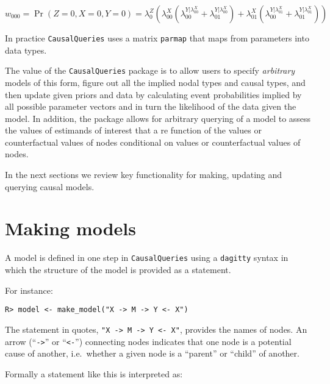 \documentclass[
  11pt,
  article]{jss}
\begin{document}
\[w_{000}=\Pr(Z=0, X=0, Y=0) = \lambda^Z_0\left(\lambda^X_{00}(\lambda^{Y|\lambda^X_{00}}_{00}+\lambda^{Y|\lambda^X_{00}}_{01}) + \lambda^X_{01}(\lambda^{Y|\lambda^X_{01}}_{00}+\lambda^{Y|\lambda^X_{01}}_{01})\right)\]

In practice \texttt{CausalQueries} uses a matrix \texttt{parmap} that
maps from parameters into data types.

The value of the \texttt{CausalQueries} package is to allow users to
specify \emph{arbitrary} models of this form, figure out all the implied
nodal types and causal types, and then update given priors and data by
calculating event probabilities implied by all possible parameter
vectors and in turn the likelihood of the data given the model. In
addition, the package allows for arbitrary querying of a model to assess
the values of estimands of interest that a re function of the values or
counterfactual values of nodes conditional on values or counterfactual
values of nodes.

In the next sections we review key functionality for making, updating
and querying causal models.

\hypertarget{sec-make}{%
\section{Making models}\label{sec-make}}

A model is defined in one step in \texttt{CausalQueries} using a
\texttt{dagitty} syntax \citep{textor_robust_2016} in which the
structure of the model is provided as a statement.

For instance:

\begin{verbatim}
R> model <- make_model("X -> M -> Y <- X")
\end{verbatim}

The statement in quotes,
\texttt{"X\ -\textgreater{}\ M\ -\textgreater{}\ Y\ \textless{}-\ X"},
provides the names of nodes. An arrow (``\texttt{-\textgreater{}}'' or
``\texttt{\textless{}-}'') connecting nodes indicates that one node is a
potential cause of another, i.e.~whether a given node is a ``parent'' or
``child'' of another.

Formally a statement like this is interpreted as:
\end{document}
